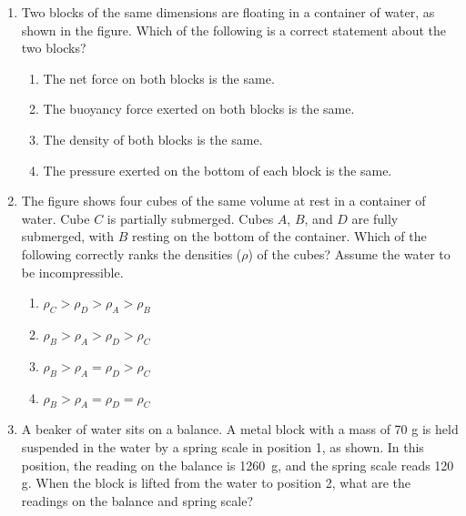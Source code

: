 \documentclass{../../../oss-legalpaper}
\begin{document}
\begin{multicols}{2}
\begin{enumerate}[leftmargin=18pt,resume]
  \item Two blocks of the same dimensions are floating in a container of water,
    as shown in the figure. Which of the following is a correct statement about
    the two blocks?
    \begin{center}
      \vspace{-.15in}
    \end{center}
    \begin{enumerate}[nosep,leftmargin=18pt,label=(\Alph*)]
    \item The net force on both blocks is the same.
    \item The buoyancy force exerted on both blocks is the same.
    \item The density of both blocks is the same.
    \item The pressure exerted on the bottom of each block is the same.
    \end{enumerate}
    \columnbreak
    
  \item The figure shows four cubes of the same volume at rest in a container
    of water. Cube $C$ is partially submerged. Cubes $A$, $B$, and $D$ are fully
    submerged, with $B$ resting on the bottom of the container. Which of the
    following correctly ranks the densities ($\rho$) of the cubes? Assume the
    water to be incompressible.
    \begin{center}
      \vspace{-.15in}
    \end{center}
    \begin{enumerate}[nosep,leftmargin=18pt,label=(\Alph*)]
    \item $\rho_C >\rho_D >\rho_A >\rho_B$
    \item $\rho_B >\rho_A >\rho_D >\rho_C$
    \item $\rho_B >\rho_A =\rho_D >\rho_C$
    \item $\rho_B >\rho_A =\rho_D =\rho_C$
    \end{enumerate}
    \vspace{.7in}
    
  \item A beaker of water sits on a balance. A metal block with a mass of
    70 g is held suspended in the water by a spring scale in position 1, as
    shown. In this position, the reading on the balance is
    \SI{1260}{\gram}, and the spring scale reads 120 g. When the block is
    lifted from the water to position 2, what are the readings on the balance
    and spring scale?
    \begin{center}
      \vspace{-.15in}


\end{center}
\end{enumerate}
\end{multicols}
\end{document}
